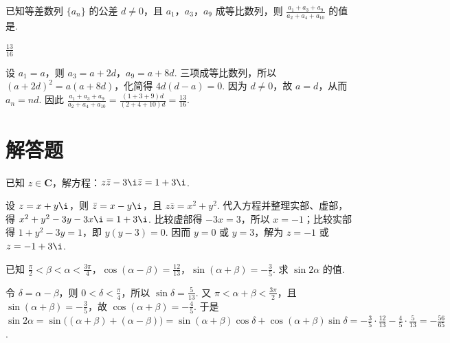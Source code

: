 \documentclass[UTF8,a4paper,oneside,11pt]{ctexbook}
\begin{document}
\begin{problem}
已知等差数列 \(\{a_n\}\) 的公差 \(d\neq 0\)，且 \(a_1\)，\(a_3\)，\(a_9\) 成等比数列，则 \(\frac{a_1+a_3+a_9}{a_2+a_4+a_{10}}\) 的值是\fillinblank{}.

\begin{answer}
\(\frac{13}{16}\)
\end{answer}

\begin{solution}
设 \(a_1=a\)，则 \(a_3=a+2d\)，\(a_9=a+8d\). 三项成等比数列，所以 \((a+2d)^2=a(a+8d)\)，化简得 \(4d(d-a)=0\). 因为 \(d\neq0\)，故 \(a=d\)，从而 \(a_n=nd\). 因此
\(\frac{a_1+a_3+a_9}{a_2+a_4+a_{10}}=\frac{(1+3+9)d}{(2+4+10)d}=\frac{13}{16}\).
\end{solution}
\end{problem}

\section{解答题}

\begin{problem}
已知 \(z\in \mathbf{C}\)，解方程：\(z\bar{z}-3\i\bar{z}=1+3\i\).

\begin{solution}
设 \(z=x+y\i\)，则 \(\bar z=x-y\i\)，且 \(z\bar z=x^2+y^2\). 代入方程并整理实部、虚部，得
\(x^2+y^2-3y-3x\i=1+3\i\). 比较虚部得 \(-3x=3\)，所以 \(x=-1\)；比较实部得 \(1+y^2-3y=1\)，即 \(y(y-3)=0\). 因而 \(y=0\) 或 \(y=3\)，解为 \(z=-1\) 或 \(z=-1+3\i\).
\end{solution}
\end{problem}

\begin{problem}
已知 \(\frac{\pi}{2}<\beta<\alpha<\frac{3\pi}{4}\)，\(\cos(\alpha-\beta)=\frac{12}{13}\)，\(\sin(\alpha+\beta)=-\frac{3}{5}\). 求 \(\sin 2\alpha\) 的值.

\begin{solution}
令 \(\delta=\alpha-\beta\)，则 \(0<\delta<\frac{\pi}{4}\)，所以 \(\sin\delta=\frac{5}{13}\). 又 \(\pi<\alpha+\beta<\frac{3\pi}{2}\)，且 \(\sin(\alpha+\beta)=-\frac{3}{5}\)，故 \(\cos(\alpha+\beta)=-\frac{4}{5}\). 于是
\(\sin2\alpha=\sin\bigl((\alpha+\beta)+(\alpha-\beta)\bigr)=\sin(\alpha+\beta)\cos\delta+\cos(\alpha+\beta)\sin\delta= -\frac{3}{5}\cdot\frac{12}{13}-\frac{4}{5}\cdot\frac{5}{13}=-\frac{56}{65}\).
\end{solution}
\end{problem}
\end{document}

